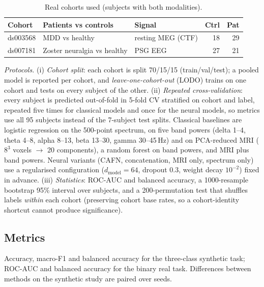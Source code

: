 \begin{table}[!t]
\caption{Real cohorts used (subjects with both modalities).}
\label{tab:cohorts}
\centering\scriptsize\setlength{\tabcolsep}{3pt}
\begin{tabular}{@{}lllrr@{}}
\toprule
Cohort & Patients vs controls & Signal & Ctrl & Pat\\
\midrule
ds003568 & MDD vs healthy & resting MEG (CTF) & 18 & 29\\
ds007181 & Zoster neuralgia vs healthy & PSG EEG & 27 & 21\\
\bottomrule
\end{tabular}
\end{table}

\emph{Protocols.} (i) \emph{Cohort split}: each cohort is split 70/15/15 (train/val/test); a pooled model is reported per cohort, and \emph{leave-one-cohort-out} (LODO) trains on one cohort and tests on every subject of the other. (ii) \emph{Repeated cross-validation}: every subject is predicted out-of-fold in 5-fold CV stratified on cohort and label, repeated five times for classical models and once for the neural models, so metrics use all 95 subjects instead of the 7-subject test splits. Classical baselines are logistic regression on the 500-point spectrum, on five band powers (delta 1--4, theta 4--8, alpha 8--13, beta 13--30, gamma 30--45\,Hz) and on PCA-reduced MRI ($8^3$ voxels $\to$ 20 components), a random forest on band powers, and MRI plus band powers. Neural variants (CAFN, concatenation, MRI only, spectrum only) use a regularised configuration ($d_{\mathrm{model}}=64$, dropout 0.3, weight decay $10^{-2}$) fixed in advance. (iii) \emph{Statistics}: ROC-AUC and balanced accuracy, a 1000-resample bootstrap 95\% interval over subjects, and a 200-permutation test that shuffles labels \emph{within} each cohort (preserving cohort base rates, so a cohort-identity shortcut cannot produce significance).

\subsection{Metrics}
Accuracy, macro-F1 and balanced accuracy for the three-class synthetic task; ROC-AUC and balanced accuracy for the binary real task. Differences between methods on the synthetic study are paired over seeds.
